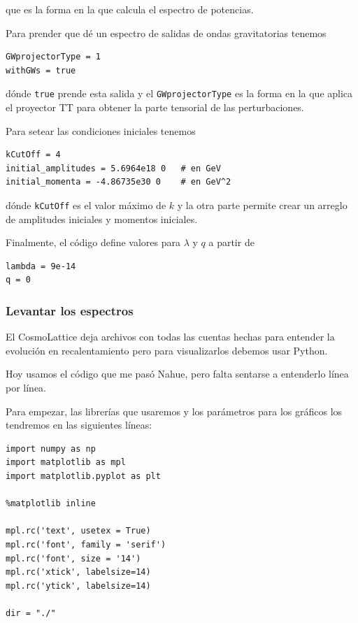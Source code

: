 \noindent
que es la forma en la que calcula el espectro de potencias.

Para prender que dé un espectro de salidas de ondas gravitatorias tenemos

\begin{lstlisting}
GWprojectorType = 1
withGWs = true
\end{lstlisting}

\noindent
dónde \texttt{true} prende esta salida y el \texttt{GWprojectorType} es la forma en la que aplica el proyector TT para obtener la parte tensorial de las perturbaciones.

Para setear las condiciones iniciales tenemos

\begin{lstlisting}[style = cppStyle]
kCutOff = 4
initial_amplitudes = 5.6964e18 0   # en GeV
initial_momenta = -4.86735e30 0    # en GeV^2
\end{lstlisting}

\noindent
dónde \texttt{kCutOff} es el valor máximo de $k$ y la otra parte permite crear un arreglo de amplitudes iniciales y momentos iniciales.

Finalmente, el código define valores para $\lambda$ y $q$ a partir de

\begin{lstlisting}[style = cppStyle]
lambda = 9e-14
q = 0
\end{lstlisting}

\subsubsection{Levantar los espectros}

El CosmoLattice deja archivos con todas las cuentas hechas para entender la evolución en recalentamiento pero para visualizarlos debemos usar Python.

Hoy usamos el código que me pasó Nahue, pero falta sentarse a entenderlo línea por línea.

Para empezar, las librerías que usaremos y los parámetros para los gráficos los tendremos en las siguientes líneas:

\begin{lstlisting}[style = pythonStyle]
import numpy as np
import matplotlib as mpl
import matplotlib.pyplot as plt

%matplotlib inline       

mpl.rc('text', usetex = True)
mpl.rc('font', family = 'serif')
mpl.rc('font', size = '14')
mpl.rc('xtick', labelsize=14) 
mpl.rc('ytick', labelsize=14) 

dir = "./"
\end{lstlisting}

